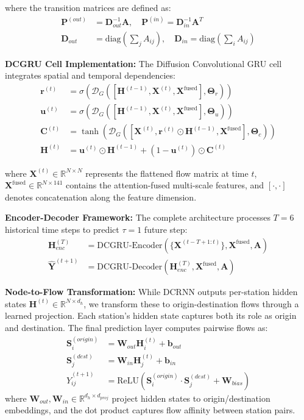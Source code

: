 \documentclass[sigconf,review,nonacm]{acmart}
\begin{document}
where the transition matrices are defined as:
\begin{align}
\mathbf{P}^{(out)} &= \mathbf{D}_{out}^{-1}\mathbf{A}, \quad \mathbf{P}^{(in)} = \mathbf{D}_{in}^{-1}\mathbf{A}^T \\
\mathbf{D}_{out} &= \text{diag}(\sum_j A_{ij}), \quad \mathbf{D}_{in} = \text{diag}(\sum_i A_{ij})
\end{align}

\textbf{DCGRU Cell Implementation:}
The Diffusion Convolutional GRU cell integrates spatial and temporal dependencies:
\begin{align}
\mathbf{r}^{(t)} &= \sigma(\mathcal{D}_G([\mathbf{H}^{(t-1)}, \mathbf{X}^{(t)}, \mathbf{X}^{\text{fused}}], \boldsymbol{\Theta}_r)) \\
\mathbf{u}^{(t)} &= \sigma(\mathcal{D}_G([\mathbf{H}^{(t-1)}, \mathbf{X}^{(t)}, \mathbf{X}^{\text{fused}}], \boldsymbol{\Theta}_u)) \\
\mathbf{C}^{(t)} &= \tanh(\mathcal{D}_G([\mathbf{X}^{(t)}, \mathbf{r}^{(t)} \odot \mathbf{H}^{(t-1)}, \mathbf{X}^{\text{fused}}], \boldsymbol{\Theta}_c)) \\
\mathbf{H}^{(t)} &= \mathbf{u}^{(t)} \odot \mathbf{H}^{(t-1)} + (1-\mathbf{u}^{(t)}) \odot \mathbf{C}^{(t)}
\end{align}

where $\mathbf{X}^{(t)} \in \mathbb{R}^{N \times N}$ represents the flattened flow matrix at time $t$, $\mathbf{X}^{\text{fused}} \in \mathbb{R}^{N \times 141}$ contains the attention-fused multi-scale features, and $[\cdot, \cdot]$ denotes concatenation along the feature dimension.

\textbf{Encoder-Decoder Framework:}
The complete architecture processes $T=6$ historical time steps to predict $\tau=1$ future step:
\begin{align}
\mathbf{H}_{enc}^{(T)} &= \text{DCGRU-Encoder}(\{\mathbf{X}^{(t-T+1:t)}\}, \mathbf{X}^{\text{fused}}, \mathbf{A}) \\
\hat{\mathbf{Y}}^{(t+1)} &= \text{DCGRU-Decoder}(\mathbf{H}_{enc}^{(T)}, \mathbf{X}^{\text{fused}}, \mathbf{A})
\end{align}

\textbf{Node-to-Flow Transformation:}
While DCRNN outputs per-station hidden states $\mathbf{H}^{(t)} \in \mathbb{R}^{N \times d_h}$, we transform these to origin-destination flows through a learned projection. Each station's hidden state captures both its role as origin and destination. The final prediction layer computes pairwise flows as:
\begin{align}
\mathbf{S}_i^{(origin)} &= \mathbf{W}_{out} \mathbf{H}_i^{(t)} + \mathbf{b}_{out} \\
\mathbf{S}_j^{(dest)} &= \mathbf{W}_{in} \mathbf{H}_j^{(t)} + \mathbf{b}_{in} \\
\hat{Y}_{ij}^{(t+1)} &= \text{ReLU}(\mathbf{S}_i^{(origin)} \cdot \mathbf{S}_j^{(dest)} + \mathbf{W}_{bias})
\end{align}
where $\mathbf{W}_{out}, \mathbf{W}_{in} \in \mathbb{R}^{d_h \times d_{proj}}$ project hidden states to origin/destination embeddings, and the dot product captures flow affinity between station pairs.
\end{document}
